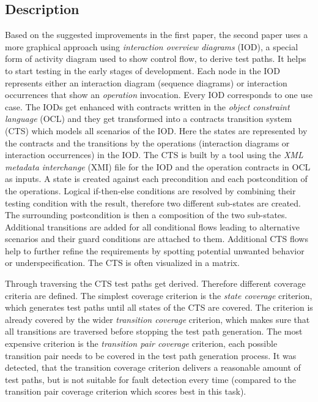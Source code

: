 \subsection{Description}

Based on the suggested improvements in the first paper, the second paper uses a more graphical approach using \textit{interaction overview diagrams} (IOD), a special form of activity diagram used to show control flow, to derive test paths. It helps to start testing in the early stages of development. Each node in the IOD represents either an interaction diagram (sequence diagrams) or interaction occurrences that show an \textit{operation} invocation. Every IOD corresponds to one use case. The IODs get enhanced with contracts written in the \textit{object constraint language} (OCL) and they get transformed into a contracts transition system (CTS) which models all scenarios of the IOD. Here the states are represented by the contracts and the transitions by the operations (interaction diagrams or interaction occurrences) in the IOD. The CTS is built by a tool using the \textit{XML metadata interchange} (XMI) file for the IOD and the operation contracts in OCL as inputs. A state is created against each precondition and each postcondition of the operations. Logical if-then-else conditions are resolved by combining their testing condition with the result, therefore two different sub-states are created. The surrounding postcondition is then a composition of the two sub-states. Additional transitions are added for all conditional flows leading to alternative scenarios and their guard conditions are attached to them. Additional CTS flows help to further refine the requirements by spotting potential unwanted behavior or underspecification. The CTS is often visualized in a matrix. 

Through traversing the CTS test paths get derived. Therefore different coverage criteria are defined. The simplest coverage criterion is the \textit{state coverage} criterion, which generates test paths until all states of the CTS are covered. The criterion is already covered by the wider \textit{transition coverage} criterion, which makes sure that all transitions are traversed before stopping the test path generation. The most expensive criterion is the \textit{transition pair coverage} criterion, each possible transition pair needs to be covered in the test path generation process. It was detected, that the transition coverage criterion delivers a reasonable amount of test paths, but is not suitable for fault detection every time (compared to the transition pair coverage criterion which scores best in this task). 


